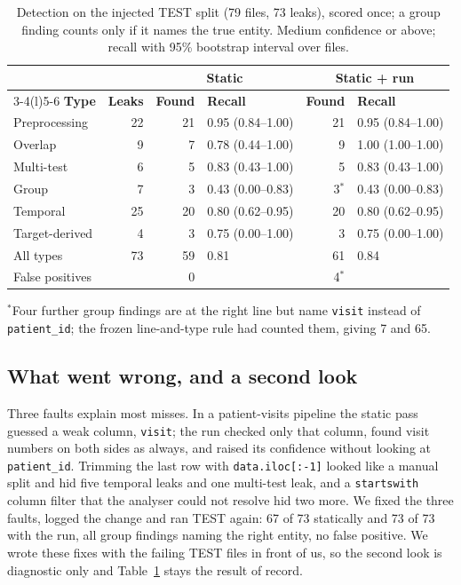 \documentclass[conference]{IEEEtran}
\newcommand{\code}[1]{\texttt{#1}}
\begin{document}
\begin{table}[t]
\caption{Detection on the injected TEST split (79 files, 73 leaks), scored once; a group finding counts only if it
names the true entity. Medium confidence or above; recall with 95\% bootstrap interval over files.}
\label{tab:test}
\footnotesize
\setlength{\tabcolsep}{2.6pt}
\begin{tabular}{@{}lrrlrl@{}}
\toprule
 & & \multicolumn{2}{c}{\textbf{Static}} & \multicolumn{2}{c}{\textbf{Static + run}} \\
\cmidrule(lr){3-4}\cmidrule(l){5-6}
\textbf{Type} & \textbf{Leaks} & \textbf{Found} & \textbf{Recall} & \textbf{Found} & \textbf{Recall} \\
\midrule
Preprocessing & 22 & 21 & 0.95 (0.84--1.00) & 21 & 0.95 (0.84--1.00) \\
Overlap & 9 & 7 & 0.78 (0.44--1.00) & 9 & 1.00 (1.00--1.00) \\
Multi-test & 6 & 5 & 0.83 (0.43--1.00) & 5 & 0.83 (0.43--1.00) \\
Group & 7 & 3 & 0.43 (0.00--0.83) & 3$^{*}$ & 0.43 (0.00--0.83) \\
Temporal & 25 & 20 & 0.80 (0.62--0.95) & 20 & 0.80 (0.62--0.95) \\
Target-derived & 4 & 3 & 0.75 (0.00--1.00) & 3 & 0.75 (0.00--1.00) \\
\midrule
All types & 73 & 59 & 0.81 & 61 & 0.84 \\
False positives & & 0 & & 4$^{*}$ & \\
\bottomrule
\end{tabular}

\vspace{2pt}
\raggedright $^{*}$Four further group findings are at the right line but name \code{visit} instead of
\code{patient\_id}; the frozen line-and-type rule had counted them, giving 7 and 65.
\end{table}

\subsection{What went wrong, and a second look}\label{sec:second}

Three faults explain most misses. In a patient-visits pipeline the static pass guessed a weak column,
\code{visit}; the run checked only that column, found visit numbers on both sides as always, and raised its
confidence without looking at \code{patient\_id}. Trimming the last row with \code{data.iloc[:-1]}
looked like a manual split and hid five temporal leaks and one multi-test leak, and a \code{startswith} column
filter that the analyser could not resolve hid two more. We fixed the three faults, logged the change and ran
TEST again: 67 of 73 statically and 73 of 73 with the run, all group findings naming the right entity, no false
positive. We wrote these fixes with the failing TEST files in
front of us, so the second look is diagnostic only and Table~\ref{tab:test} stays the result of record.
\end{document}
